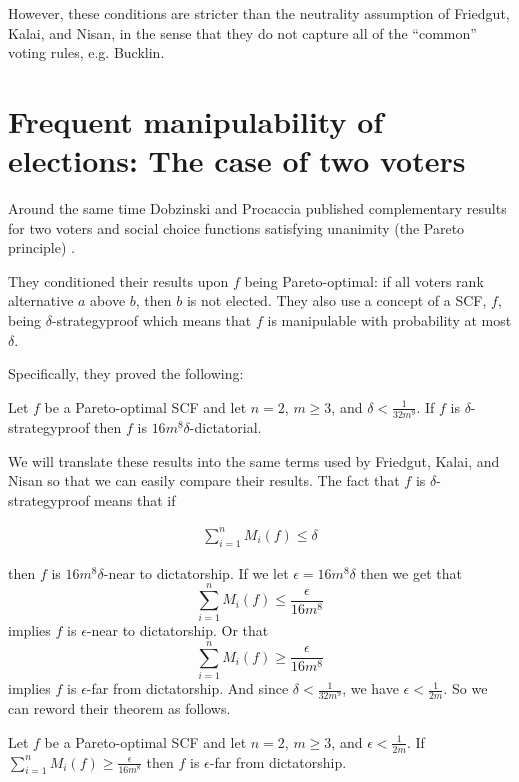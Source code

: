 	However, these conditions are stricter than the neutrality assumption of Friedgut, Kalai, and Nisan, in the sense that they do not capture all of the ``common'' voting rules, e.g. Bucklin.


\section{Frequent manipulability of elections: The case of two voters}

	Around the same time Dobzinski and Procaccia published complementary results for two voters and social choice functions satisfying unanimity (the Pareto principle) \cite{dobzinski2008frequent}.

	They conditioned their results upon $f$ being Pareto-optimal: if all voters rank alternative $a$ above $b$, then $b$ is not elected. They also use a concept of a SCF, $f$, being $\delta$-strategyproof which means that $f$ is manipulable with probability at most $\delta$.

	Specifically, they proved the following:

	\begin{theorem}
		Let $f$ be a Pareto-optimal SCF and let $n = 2$, $m \ge 3$, and $\delta < \frac{1}{32m^9}$. If $f$ is $\delta$-strategyproof then $f$ is $16m^8 \delta$-dictatorial.
	\end{theorem}

	We will translate these results into the same terms used by Friedgut, Kalai, and Nisan so that we can easily compare their results. The fact that $f$ is $\delta$-strategyproof means that if

	\begin{align*}
		\sum_{i=1}^n M_i(f) \le \delta
	\end{align*}

	then $f$ is $16m^8 \delta$-near to dictatorship. If we let $\epsilon = 16m^8 \delta$ then we get that
	\[
		\sum_{i=1}^n M_i(f) \le \frac{\epsilon}{16m^8}
	\]
	implies $f$ is $\epsilon$-near to dictatorship. Or that
	\[
		\sum_{i=1}^n M_i(f) \ge \frac{\epsilon}{16m^8}
	\]
	implies $f$ is $\epsilon$-far from dictatorship. And since $\delta < \frac{1}{32m^9}$, we have $\epsilon < \frac{1}{2m}$. So we can reword their theorem as follows.

	\begin{theorem}
		Let $f$ be a Pareto-optimal SCF and let $n = 2$, $m \ge 3$, and $\epsilon < \frac{1}{2m}$. If $\sum_{i=1}^n M_i(f) \ge \frac{\epsilon}{16m^8}$ then $f$ is $\epsilon$-far from dictatorship.
	\end{theorem}

